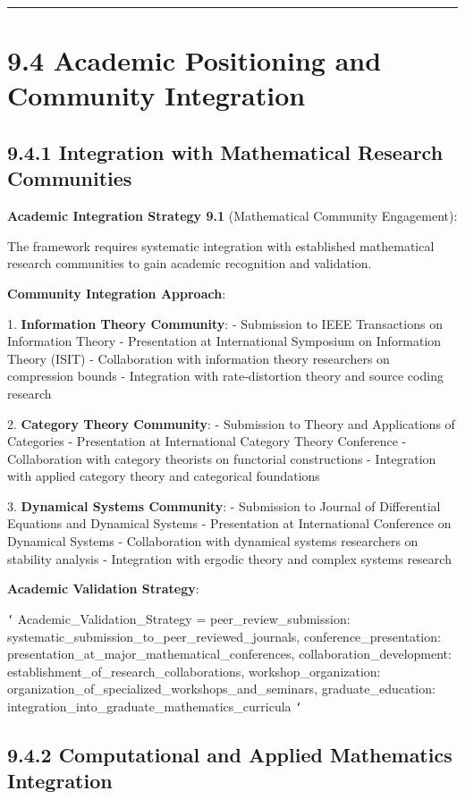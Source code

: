 \hrule

\section{9.4 Academic Positioning and Community Integration}

\subsection{9.4.1 Integration with Mathematical Research Communities}

\textbf{Academic Integration Strategy 9.1} (Mathematical Community Engagement):

The framework requires systematic integration with established mathematical research communities to gain academic recognition and validation.

\textbf{Community Integration Approach}:

1. \textbf{Information Theory Community}:
   - Submission to IEEE Transactions on Information Theory
   - Presentation at International Symposium on Information Theory (ISIT)
   - Collaboration with information theory researchers on compression bounds
   - Integration with rate-distortion theory and source coding research

2. \textbf{Category Theory Community}:
   - Submission to Theory and Applications of Categories
   - Presentation at International Category Theory Conference
   - Collaboration with category theorists on functorial constructions
   - Integration with applied category theory and categorical foundations

3. \textbf{Dynamical Systems Community}:
   - Submission to Journal of Differential Equations and Dynamical Systems
   - Presentation at International Conference on Dynamical Systems
   - Collaboration with dynamical systems researchers on stability analysis
   - Integration with ergodic theory and complex systems research

\textbf{Academic Validation Strategy}:

\texttt{`}
Academic_Validation_Strategy = {
    peer_review_submission: systematic_submission_to_peer_reviewed_journals,
    conference_presentation: presentation_at_major_mathematical_conferences,
    collaboration_development: establishment_of_research_collaborations,
    workshop_organization: organization_of_specialized_workshops_and_seminars,
    graduate_education: integration_into_graduate_mathematics_curricula
}
\texttt{`}

\subsection{9.4.2 Computational and Applied Mathematics Integration}

